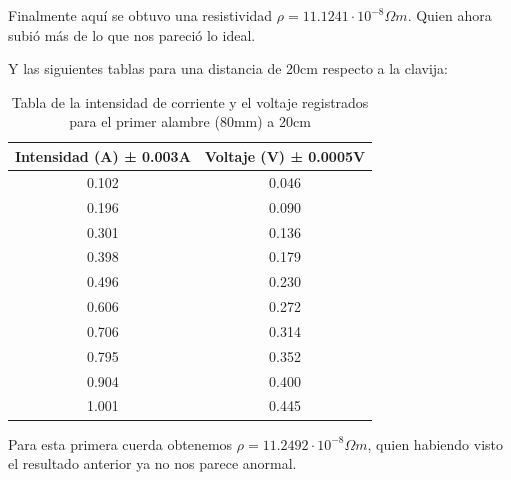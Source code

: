 \documentclass[article,12pt]{elsarticle}
\begin{document}
Finalmente aquí se obtuvo una resistividad $\rho = 11.1241 \cdot 10^{-8} \Omega m$. Quien ahora subió más de lo que nos pareció lo ideal.

Y las siguientes tablas para una distancia de 20cm respecto a la clavija:
    \begin{table}[H]
\begin{tabular}{|c|c|}
\hline
Intensidad (A) ± 0.003A & Voltaje (V) ± 0.0005V \\ \hline
0.102                   & 0.046                 \\ \hline
0.196                   & 0.090                  \\ \hline
0.301                   & 0.136                 \\ \hline
0.398                   & 0.179                 \\ \hline
0.496                   & 0.230                  \\ \hline
0.606                   & 0.272                 \\ \hline
0.706                   & 0.314                 \\ \hline
0.795                   & 0.352                 \\ \hline
0.904                   & 0.400                   \\ \hline
1.001                   & 0.445                 \\ \hline
\end{tabular}
\caption{Tabla de la intensidad de corriente y el voltaje registrados para el primer alambre (80mm) a 20cm}
\end{table}

Para esta primera cuerda obtenemos $\rho = 11.2492 \cdot 10^{-8} \Omega m$, quien habiendo visto el resultado anterior ya no nos parece anormal.
\end{document}
